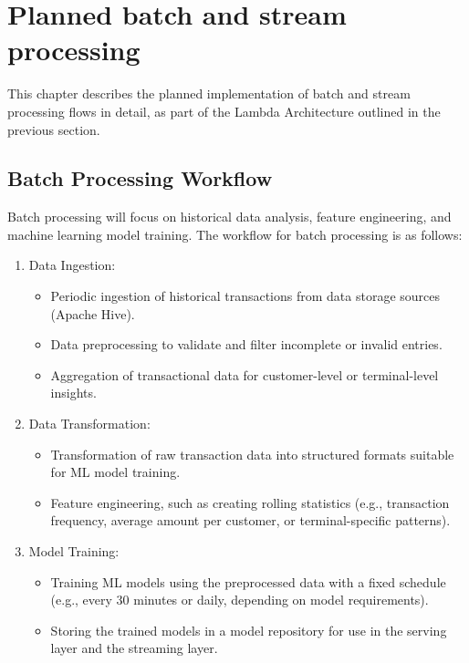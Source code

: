 \documentclass[12pt,a4paper, hidelinks]{article}
\begin{document}
\section{Planned batch and stream processing}

This chapter describes the planned implementation of batch and stream processing flows in detail, as part of the Lambda Architecture outlined in the previous section.

\subsection{Batch Processing Workflow}
Batch processing will focus on historical data analysis, feature engineering, and machine learning model training. The workflow for batch processing is as follows:

\begin{enumerate}
    \item Data Ingestion:
        \begin{itemize}
            \item Periodic ingestion of historical transactions from data storage sources (Apache Hive).
            \item Data preprocessing to validate and filter incomplete or invalid entries.
            \item Aggregation of transactional data for customer-level or terminal-level insights.
        \end{itemize}
    \item Data Transformation:
        \begin{itemize}
            \item Transformation of raw transaction data into structured formats suitable for ML model training.
            \item Feature engineering, such as creating rolling statistics (e.g., transaction frequency, average amount per customer, or terminal-specific patterns).
        \end{itemize}
    \item Model Training:
        \begin{itemize}
            \item Training ML models using the preprocessed data with a fixed schedule (e.g., every 30 minutes or daily, depending on model requirements).
            \item Storing the trained models in a model repository for use in the serving layer and the streaming layer.
        \end{itemize}
\end{enumerate}
\end{document}
